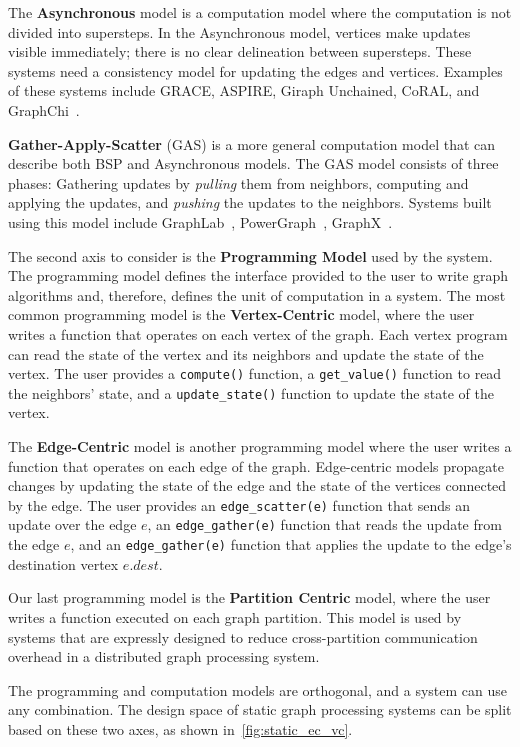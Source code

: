 The \textbf{Asynchronous} model is a computation model where the computation is not divided into supersteps. 
In the Asynchronous model, vertices make updates visible immediately; there is no clear delineation between supersteps.
These systems need a consistency model for updating the edges and vertices.
Examples of these systems include GRACE, ASPIRE, Giraph Unchained, CoRAL, and GraphChi~\cite{kyrola2012graphchi}.

\textbf{Gather-Apply-Scatter} (GAS) is a more general computation model that can describe both BSP and Asynchronous models.
The GAS model consists of three phases: Gathering updates by \emph{pulling} them from neighbors, computing and applying the updates, and \emph{pushing} the updates to the neighbors.
Systems built using this model include GraphLab~\cite{low2012distributed}, PowerGraph~\cite{gonzalez2012powergraph}, GraphX~\cite{gonzalez2014graphx}.


The second axis to consider is the \textbf{Programming Model} used by the system.
The programming model defines the interface provided to the user to write graph algorithms and, therefore, defines the unit of computation in a system.
The most common programming model is the \textbf{Vertex-Centric} model, where the user writes a function that operates on each vertex of the graph.
Each vertex program can read the state of the vertex and its neighbors and update the state of the vertex.
The user provides a \texttt{compute()} function, a \texttt{get\_value()} function to read the neighbors' state, and a \texttt{update\_state()} function to update the state of the vertex.

The \textbf{Edge-Centric} model is another programming model where the user writes a function that operates on each edge of the graph.
Edge-centric models propagate changes by updating the state of the edge and the state of the vertices connected by the edge.
The user provides an \texttt{edge\_scatter(e)} function that sends an update over the edge $e$, an \texttt{edge\_gather(e)} function that reads the update from the edge $e$, and an \texttt{edge\_gather(e)} function that applies the update to the edge's destination vertex $e.dest$.

Our last programming model is the \textbf{Partition Centric} model, where the user writes a function executed on each graph partition.
This model is used by systems that are expressly designed to reduce cross-partition communication overhead in a distributed graph processing system.

The programming and computation models are orthogonal, and a system can use any combination.
The design space of static graph processing systems can be split based on these two axes, as shown in~\autoref{fig:static_ec_vc}.

